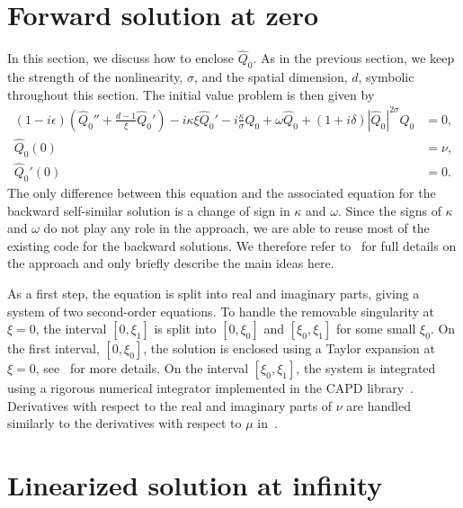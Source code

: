 \documentclass[11pt]{article}
\begin{document}
\section{Forward solution at zero}
\label{sec:forward-solution-zero}

In this section, we discuss how to enclose \(\hat{Q}_{0}\). As in
the previous section, we keep the strength of the nonlinearity,
\(\sigma\), and the spatial dimension, \(d\), symbolic throughout this
section. The initial value problem is then given by
\begin{equation*}
  \begin{split}
    (1 - i\epsilon)\left(\hat{Q}_{0}'' + \frac{d - 1}{\xi}\hat{Q}_{0}'\right) - i\kappa\xi \hat{Q}_{0}'
    - i \frac{\kappa}{\sigma}\hat{Q}_{0} + \omega \hat{Q}_{0} + (1 + i\delta)|\hat{Q}_{0}|^{2\sigma}\hat{Q}_{0} &= 0,\\
    \hat{Q}_{0}(0) &= \nu,\\
    \hat{Q}_{0}'(0) &= 0.
  \end{split}
\end{equation*}
The only difference between this equation and the associated equation
for the backward self-similar solution is a change of sign in
\(\kappa\) and \(\omega\). Since the signs of \(\kappa\) and
\(\omega\) do not play any role in the approach, we are able to reuse
most of the existing code for the backward solutions. We therefore
refer to~\cite[Section~8]{Dahne2024} for full details on the approach
and only briefly describe the main ideas here.

As a first step, the equation is split into real and imaginary parts,
giving a system of two second-order equations. To handle the removable
singularity at \(\xi = 0\), the interval \([0, \xi_{1}]\) is split
into \([0, \xi_{0}]\) and \([\xi_{0}, \xi_{1}]\) for some small
\(\xi_{0}\). On the first interval, \([0, \xi_{0}]\), the solution is
enclosed using a Taylor expansion at \(\xi = 0\),
see~\cite[Section~8.1]{Dahne2024} for more details. On the interval
\([\xi_{0}, \xi_{1}]\), the system is integrated using a rigorous
numerical integrator implemented in the CAPD
library~\cite{Kapela2021}. Derivatives with respect to the real and
imaginary parts of \(\nu\) are handled similarly to the derivatives
with respect to \(\mu\) in~\cite{Dahne2024}.

\section{Linearized solution at infinity}
\label{sec:linearized-solution-infinity}
\end{document}
